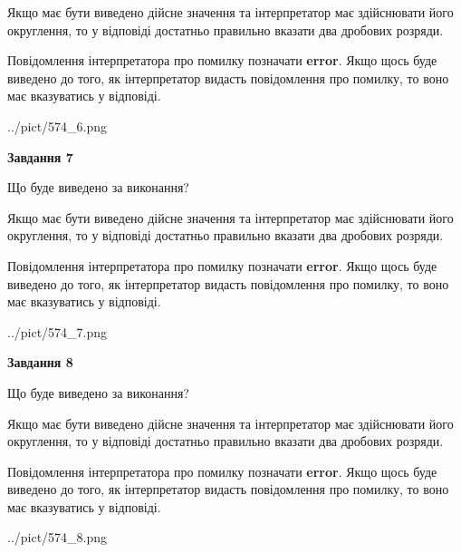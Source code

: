 \documentclass[12pt, ukrainian]{article}
\begin{document}
{\begin {Large}
Якщо має бути виведено дійсне значення та інтерпретатор має здійснювати його округлення, 
то у відповіді достатньо правильно вказати два дробових розряди.

Повідомлення інтерпретатора про помилку позначати \textbf{error}.
Якщо щось буде виведено до того, як інтерпретатор видасть повідомлення про помилку, 
то воно має вказуватись у відповіді. \par

\begin{center}
	{../pict/574_6.png}
\end{center}
\newpage

{\begin {center}\textbf{Завдання 7}\end {center}}\par
Що буде виведено за виконання? \par

Якщо має бути виведено дійсне значення та інтерпретатор має здійснювати його округлення, 
то у відповіді достатньо правильно вказати два дробових розряди.

Повідомлення інтерпретатора про помилку позначати \textbf{error}.
Якщо щось буде виведено до того, як інтерпретатор видасть повідомлення про помилку, 
то воно має вказуватись у відповіді. \par

\begin{center}
	{../pict/574_7.png}
\end{center}
\newpage

{\begin {center}\textbf{Завдання 8}\end {center}}\par
Що буде виведено за виконання? \par

Якщо має бути виведено дійсне значення та інтерпретатор має здійснювати його округлення, 
то у відповіді достатньо правильно вказати два дробових розряди.

Повідомлення інтерпретатора про помилку позначати \textbf{error}.
Якщо щось буде виведено до того, як інтерпретатор видасть повідомлення про помилку, 
то воно має вказуватись у відповіді. \par

\begin{center}
	{../pict/574_8.png}
\end{center}
\newpage


\end{Large}}
\end{document}
